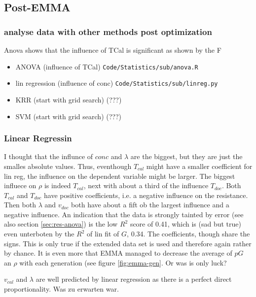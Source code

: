 \subsection{Post-EMMA}
\subsubsection{analyse data with other methods post optimization}
Anova shows that the influence of TCal is significant as shown by the F 
\begin{itemize}
    \item ANOVA (influence of TCal) \texttt{Code/Statistics/sub/anova.R}
    \item lin regression (influence of conc) \texttt{Code/Statistics/sub/linreg.py}
    \item KRR (start with grid search) (???)
    \item SVM (start with grid search) (???)
\end{itemize}

\subsubsection{Linear Regressin}
I thought that the influnce of $conc$ and $\lambda$ are the biggest, but they are just the smalles absolute values. 
Thus, eventhough $T_{cal}$ might have a smaller coefficient for lin reg, the influence on the dependent variable might be larger. 
The biggest influece on $\rho$ is indeed $T_{cal}$, next with about a third of the influence $T_{doc}$. 
Both $T_{cal}$ and $T_{doc}$ have positive coefficients, i.e. a negative influence on the resistance. 
Then both $\lambda$ and $v_{doc}$ both have about a fift ob the largest influence and a negative influence. 
An indication that the data is strongly tainted by error (see also section \ref{sec:res-anova}) is the low $R^2$ score of 0.41, 
which is (sad but true) even unterboten by the $R^2$ of lin fit of $G$, 0.34. 
The coefficients, though share the signs. 
This is only true if the extended data set is used and therefore again rather by chance. 
It is even more  that EMMA managed to decrease the average of $pG$ an $\rho$ with each generation (see figure \ref{fig:emma-gen}. 
Or was is only luck? 

$v_{cal}$ and $\lambda$ are well predicted by linear regression as there is a perfect direct proportionality. 
Was zu erwarten war. 


